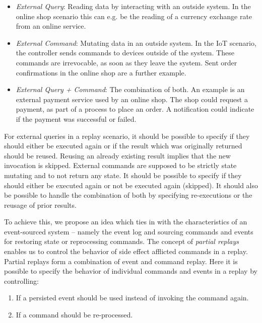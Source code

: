 \begin{itemize} 
	\item \emph{External Query}: Reading data by interacting with an outside 
	system. In the online shop scenario this can e.g. be the reading of a 
	currency exchange rate from an online service.

	\item \emph{External Command}: Mutating data in an outside system.
	In the IoT scenario, the controller sends commands to devices outside
	of the system.
	These commands are irrevocable, as soon as they leave the system.
	Sent order confirmations in the online shop are a further example.

	\item \emph{External Query + Command}: The combination of both.
	An example is an external payment service used by an online
	shop. The shop could request a payment, as part of a
	process to place an order. A notification could indicate if the
	payment was successful or failed.
\end{itemize}

For external queries in a replay scenario, it should be possible to specify if they 
should either be executed again or if the result which was originally returned
should be reused. Reusing an already existing result implies that the new invocation 
is skipped.
%
External commands are supposed to be strictly state mutating and to not return any 
state. It should be possible to specify if they should either be executed again or 
not be executed again (skipped). It should also be possible to handle the 
combination of both by specifying re-executions or the reusage of prior results.

To achieve this, we propose an idea which ties in with the characteristics of an 
event-sourced system -- namely the event log and sourcing commands and events for 
restoring state or reprocessing commands. The concept of \emph{partial replays}
enables us to control the behavior of side effect afflicted commands in a
replay. Partial replays form a combination of event and command replay.
Here it is possible to specify the behavior of individual commands and events in 
a replay by controlling:

\begin{enumerate}
	\item If a persisted event should be used instead of invoking the command again.
	\item If a command should be re-processed.
\end{enumerate}

